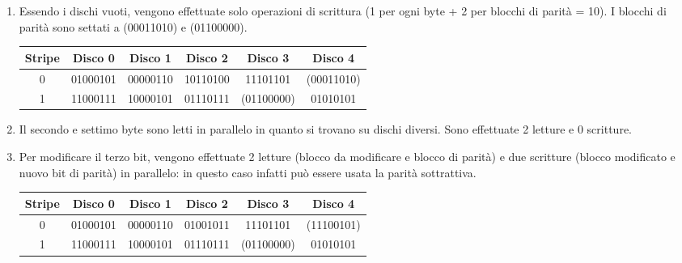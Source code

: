 \documentclass[12pt]{article}
\begin{document}
\begin{enumerate}
    \color{blue}
    \item Essendo i dischi vuoti, vengono effettuate solo operazioni di scrittura (1 per ogni byte + 2 per blocchi di parità = 10). I blocchi di parità sono settati a (00011010) e (01100000).\\
    \begin{tabular}{|c|c|c|c|c|c|}
        \hline
        Stripe & Disco 0 & Disco 1 & Disco 2 & Disco 3 & Disco 4 \\
        \hline
        0 &  01000101 & 00000110 & 10110100 & 11101101 & (00011010) \\
        \hline
        1 & 11000111 & 10000101 & 01110111 & (01100000) & 01010101 \\
        \hline
    \end{tabular}
    \item Il secondo e settimo byte sono letti in parallelo in quanto si trovano su dischi diversi. Sono effettuate 2 letture e 0 scritture.
    \item Per modificare il terzo bit, vengono effettuate 2 letture (blocco da modificare e blocco di parità) e due scritture (blocco modificato e nuovo bit di parità) in parallelo: in questo caso infatti può essere usata la parità sottrattiva.\\
    \begin{tabular}{|c|c|c|c|c|c|}
        \hline
        Stripe & Disco 0 & Disco 1 & Disco 2 & Disco 3 & Disco 4 \\
        \hline
        0 &  01000101 & 00000110 & 01001011 & 11101101 & (11100101) \\
        \hline
        1 & 11000111 & 10000101 & 01110111 & (01100000) & 01010101 \\
        \hline
    \end{tabular}
\end{enumerate}
\end{document}
